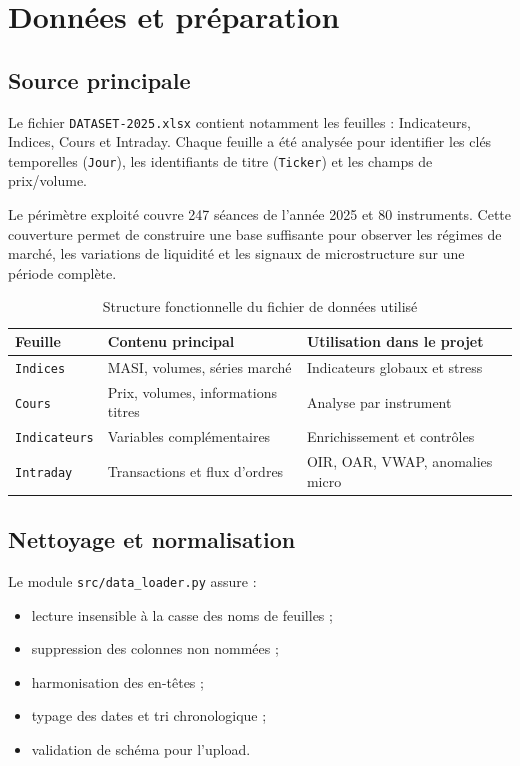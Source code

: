 \documentclass[a4paper,12pt,twoside,openright]{report}
\begin{document}
\chapter{Données et préparation}
\label{chap:donnees}

\section{Source principale}
Le fichier \texttt{DATASET-2025.xlsx} contient notamment les feuilles : Indicateurs, Indices, Cours et Intraday. Chaque feuille a été analysée pour identifier les clés temporelles (\texttt{Jour}), les identifiants de titre (\texttt{Ticker}) et les champs de prix/volume.

Le périmètre exploité couvre 247 séances de l'année 2025 et 80 instruments. Cette couverture permet de construire une base suffisante pour observer les régimes de marché, les variations de liquidité et les signaux de microstructure sur une période complète.

\begin{table}[H]
  \centering
  \caption{Structure fonctionnelle du fichier de données utilisé}
  \begin{tabular}{lll}
    \toprule
    Feuille & Contenu principal & Utilisation dans le projet \\
    \midrule
    \texttt{Indices} & MASI, volumes, séries marché & Indicateurs globaux et stress \\
    \texttt{Cours} & Prix, volumes, informations titres & Analyse par instrument \\
    \texttt{Indicateurs} & Variables complémentaires & Enrichissement et contrôles \\
    \texttt{Intraday} & Transactions et flux d'ordres & OIR, OAR, VWAP, anomalies micro \\
    \bottomrule
  \end{tabular}
\end{table}

\section{Nettoyage et normalisation}
Le module \texttt{src/data\_loader.py} assure :
\begin{itemize}
  \item lecture insensible à la casse des noms de feuilles ;
  \item suppression des colonnes non nommées ;
  \item harmonisation des en-têtes ;
  \item typage des dates et tri chronologique ;
  \item validation de schéma pour l'upload.
\end{itemize}
\end{document}
